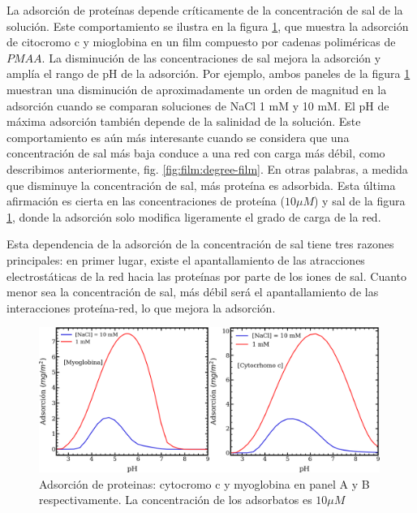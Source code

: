 La adsorci\'on de prote\'inas depende cr\'iticamente de la concentraci\'on de sal de la soluci\'on. Este comportamiento se ilustra en la figura \ref{fig:film:ad-pro}, que muestra la adsorci\'on de citocromo c y mioglobina en un film compuesto por cadenas polim\'ericas de $PMAA$. La disminuci\'on de las concentraciones de sal mejora la adsorci\'on y ampl\'ia el rango de pH de la adsorci\'on.
Por ejemplo, ambos paneles de la figura \ref{fig:film:ad-pro} muestran una disminuci\'on de aproximadamente un orden de magnitud en la adsorci\'on cuando se comparan soluciones de NaCl 1 mM y 10 mM.
El pH de m\'axima adsorci\'on tambi\'en depende de la salinidad de la soluci\'on. Este comportamiento es a\'un m\'as interesante cuando se considera que una concentraci\'on de sal m\'as baja conduce a una red con carga m\'as d\'ebil, como describimos anteriormente, fig. \ref{fig:film:degree-film}.
En otras palabras, a medida que disminuye la concentraci\'on de sal, m\'as prote\'ina es adsorbida. Esta \'ultima afirmaci\'on es cierta en las concentraciones de prote\'ina ($10 \mu M$) y sal de la figura \ref{fig:film:ad-pro}, donde la adsorci\'on solo modifica ligeramente el grado de carga de la red.

Esta dependencia de la adsorci\'on de la concentraci\'on de sal tiene tres razones principales: en primer lugar, existe el apantallamiento de las atracciones electrost\'aticas de la red hacia las prote\'inas por parte de los iones de sal.
Cuanto menor sea la concentraci\'on de sal, m\'as d\'ebil ser\'a el apantallamiento de las interacciones prote\'ina-red, lo que mejora la adsorci\'on.




\begin{figure}
    \centering
    \includegraphics[width=0.99\textwidth]{Figures/graph-film/ad-proteins.png}
    \caption{Adsorci\'on de proteinas: cytocromo c y myoglobina en panel A y B respectivamente. La concentraci\'on de los adsorbatos es $10 \mu M$}
    \label{fig:film:ad-pro}
\end{figure}

